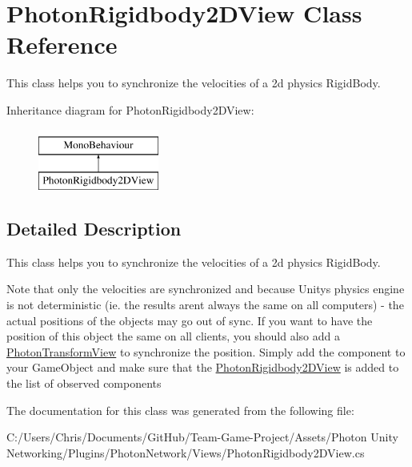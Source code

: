 \hypertarget{class_photon_rigidbody2_d_view}{}\section{Photon\+Rigidbody2\+D\+View Class Reference}
\label{class_photon_rigidbody2_d_view}


This class helps you to synchronize the velocities of a 2d physics Rigid\+Body.  


Inheritance diagram for Photon\+Rigidbody2\+D\+View\+:\begin{figure}[H]
\begin{center}
\leavevmode
\includegraphics[height=2.000000cm]{class_photon_rigidbody2_d_view}
\end{center}
\end{figure}


\subsection{Detailed Description}
This class helps you to synchronize the velocities of a 2d physics Rigid\+Body. 

Note that only the velocities are synchronized and because Unitys physics engine is not deterministic (ie. the results aren\textquotesingle{}t always the same on all computers) -\/ the actual positions of the objects may go out of sync. If you want to have the position of this object the same on all clients, you should also add a \hyperlink{class_photon_transform_view}{Photon\+Transform\+View} to synchronize the position. Simply add the component to your Game\+Object and make sure that the \hyperlink{class_photon_rigidbody2_d_view}{Photon\+Rigidbody2\+D\+View} is added to the list of observed components 

The documentation for this class was generated from the following file\+:\begin{DoxyCompactItemize}
\item 
C\+:/\+Users/\+Chris/\+Documents/\+Git\+Hub/\+Team-\/\+Game-\/\+Project/\+Assets/\+Photon Unity Networking/\+Plugins/\+Photon\+Network/\+Views/Photon\+Rigidbody2\+D\+View.\+cs\end{DoxyCompactItemize}
